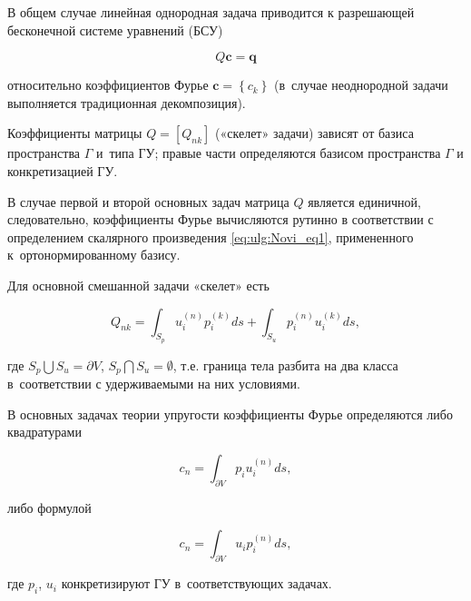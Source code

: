 В общем случае линейная однородная задача приводится к разрешающей бесконечной системе уравнений (БСУ) 

\[

Q\textbf{c}=\textbf{q}

\] 

относительно коэффициентов Фурье $\textbf{c}=\left\{c_{k} \right\}$  (в~случае неоднородной задачи выполняется традиционная декомпозиция). 

Коэффициенты матрицы $Q=\left[Q_{nk} \right]$ («скелет» задачи) зависят от  базиса пространства $\Gamma $ и~типа ГУ; правые части определяются базисом пространства $\Gamma $ и конкретизацией ГУ.



В случае первой и второй основных задач матрица $Q$ является единичной, следовательно, коэффициенты Фурье вычисляются рутинно в соответствии с определением скалярного произведения \eqref{eq:ulg:Novi_eq1}, примененного к~ортонормированному базису. 

Для основной смешанной задачи «скелет» есть

\begin{equation} \label{eq:ulg:Novi_eq07} 

Q_{nk} =\int _{S_{p} }u_{i}^{(n)} p_{i}^{(k)} ds +\int _{S_{u} }p_{i}^{(n)} u_{i}^{(k)} ds,  

\end{equation} 

где $S_{p} \bigcup S_{u} =\partial V$, $S_{p} \bigcap S_{u} =\emptyset$, т.е. граница тела разбита на два класса в~соответствии с удерживаемыми на них условиями.



В основных задачах теории упругости коэффициенты Фурье определяются либо квадратурами

\begin{equation} 

\label{eq:ulg:Novi_eq08} 

c_{n} =\int _{\partial V}  p_{i}  u_{i}^{(n)} ds , 

\end{equation} 

либо формулой

\begin{equation} \label{eq:ulg:Novi_eq09} 

c_{n} =\int _{\partial V} u_{i}  p_{i}^{(n)} ds , 

\end{equation} 

где $p_{i}$, $ u_{i}$ конкретизируют ГУ в~соответствующих задачах. 




